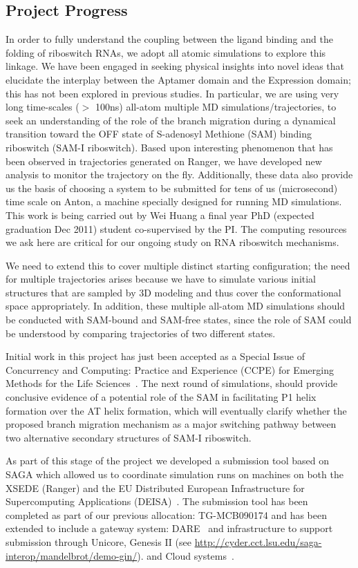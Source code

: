 \documentclass[a4paper,10pt]{article}
\begin{document}
\subsection{Project Progress}
In order to fully understand the coupling between the ligand binding
and the folding of riboswitch RNAs, we adopt all atomic simulations to
explore this linkage.  We have been engaged in seeking physical
insights into novel ideas that elucidate the interplay between the
Aptamer domain and the Expression domain; this has not been explored
in previous studies.  In particular, we are using very long
time-scales ($>$ 100ns) all-atom multiple MD simulations/trajectories,
to seek an understanding of the role of the branch migration during a
dynamical transition toward the OFF state of S-adenosyl Methione (SAM)
binding riboswitch (SAM-I riboswitch).  Based upon interesting
phenomenon that has been observed in trajectories generated on Ranger,
we have developed new analysis to monitor the trajectory on the
fly. Additionally, these data also provide us the basis of choosing a
system to be submitted for tens of us (microsecond) time scale on
Anton, a machine specially designed for running MD simulations. This
work is being carried out by Wei Huang a final year PhD (expected
graduation Dec 2011) student co-supervised by the PI.  The computing
resources we ask here are critical for our ongoing study on RNA
riboswitch mechanisms.

We need to extend this to cover multiple distinct starting
configuration; the need for multiple trajectories arises because we
have to simulate various initial structures that are sampled by 3D
modeling and thus cover the conformational space appropriately.  In
addition, these multiple all-atom MD simulations should be conducted
with SAM-bound and SAM-free states, since the role of SAM could be
understood by comparing trajectories of two different states.  

Initial work in this project has just been accepted as a Special Issue
of Concurrency and Computing: Practice and Experience (CCPE) for
Emerging Methods for the Life Sciences~\cite{ccpe10}.  The next round
of simulations, should provide conclusive evidence of a potential role
of the SAM in facilitating P1 helix formation over the AT helix
formation, which will eventually clarify whether the proposed branch
migration mechanism as a major switching pathway between two
alternative secondary structures of SAM-I riboswitch.

As part of this stage of the project we developed a submission tool
based on SAGA which allowed us to coordinate simulation runs on
machines on both the XSEDE (Ranger) and the EU Distributed European
Infrastructure for Supercomputing Applications
(DEISA)~\cite{DEISA}. The submission tool has been completed as part
of our previous allocation: TG-MCB090174 and has been extended to
include a gateway system: DARE~\cite{dare-tg11} and infrastructure to
support submission through Unicore, Genesis II (see
\url{http://cyder.cct.lsu.edu/saga-interop/mandelbrot/demo-gin/}).
and Cloud systems~\cite{pstar11}.
\end{document}
